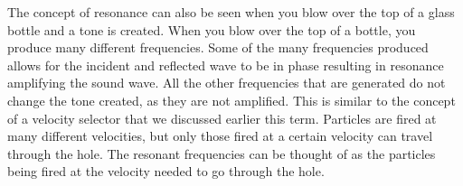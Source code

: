 \documentclass[11pt,twoside]{article}
\begin{document}
The concept of resonance can also be seen when you blow over the top of a glass bottle and a tone is created. When you blow over the top of a bottle, you produce many different frequencies. Some of the many frequencies produced allows for the incident and reflected wave to be in phase resulting in resonance amplifying the sound wave. All the other frequencies that are generated do not change the tone created, as they are not amplified. This is similar to the concept of a velocity selector that we discussed earlier this term. Particles are fired at many different velocities, but only those fired at a certain velocity can travel through the hole. The resonant frequencies can be thought of as the particles being fired at the velocity needed to go through the hole.
\end{document}
